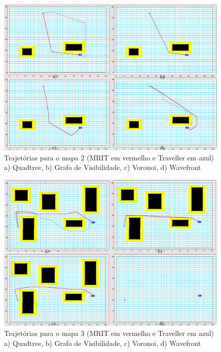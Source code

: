 \begin{figure}[H]
	\centering
	\label{fig40}
		\includegraphics[keepaspectratio=true,scale=0.3]{figuras/mapa2.jpg}
	\caption{Trajetórias para o mapa 2 (MRIT em vermelho e Traveller em azul) a) Quadtree, b) Grafo de Visibilidade, c) Voronoi, d) Wavefront}
\end{figure}

\begin{figure}[H]
	\centering
	\label{fig41}
		\includegraphics[keepaspectratio=true,scale=0.3]{figuras/mapa3.jpg}
	\caption{Trajetórias para o mapa 3 (MRIT em vermelho e Traveller em azul) a) Quadtree, b) Grafo de Visibilidade, c) Voronoi, d) Wavefront}
\end{figure}

